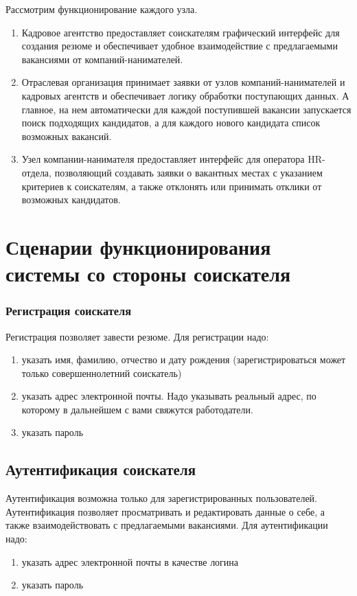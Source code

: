 Рассмотрим функционирование каждого узла.
\begin{enumerate}[1.]
\item Кадровое агентство предоставляет соискателям графический интерфейс для создания резюме и обеспечивает удобное взаимодействие с предлагаемыми вакансиями от компаний-нанимателей.
\item Отраслевая организация принимает заявки от узлов компаний-нанимателей и кадровых агентств и обеспечивает логику обработки поступающих данных. А главное, на нем автоматически для каждой поступившей вакансии запускается поиск подходящих кандидатов, а для каждого нового кандидата список возможных вакансий.
\item Узел компании-нанимателя предоставляет интерфейс для оператора HR-отдела, позволяющий создавать заявки о вакантных местах с указанием критериев к соискателям, а также отклонять или принимать отклики от возможных кандидатов.
\end{enumerate}

\section{Сценарии функционирования системы со стороны соискателя}
\subsubsection{Регистрация соискателя}
Регистрация позволяет завести резюме.
Для регистрации надо:
\begin{enumerate}
\item указать имя, фамилию, отчество и дату рождения (зарегистрироваться может только совершеннолетний соискатель)
\item указать адрес электронной почты. Надо указывать реальный адрес, по которому в дальнейшем с вами свяжутся работодатели.
\item указать пароль
\end{enumerate}
\subsection{Аутентификация соискателя}
Аутентификация возможна только для зарегистрированных пользователей. Аутентификация позволяет просматривать и редактировать данные о себе, а также взаимодействовать с предлагаемыми вакансиями.
Для аутентификации надо:
\begin{enumerate}
\item указать адрес электронной почты в качестве логина
\item указать пароль
\end{enumerate}
